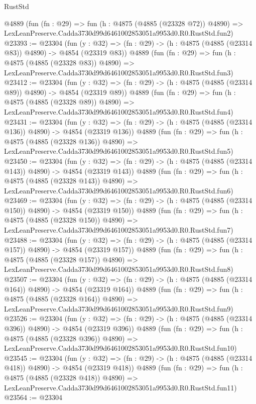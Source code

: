 \begin{lexlean}{RustStd}
\begin{coremodule}
    @4889
    (fun (fn : @29) =>
    fun (h : @4875 (@4885 (@23328 @72)) @4890) =>
    LexLeanPreserve.Cadda3730d99d6461002853051a9953d0.R0.RustStd.fun2)
@23393 := @23304
    (fun (y : @32) => (fn : @29) -> (h : @4875 (@4885 (@23314 @83)) @4890) -> @4854 (@23319 @83))
    @4889
    (fun (fn : @29) =>
    fun (h : @4875 (@4885 (@23328 @83)) @4890) =>
    LexLeanPreserve.Cadda3730d99d6461002853051a9953d0.R0.RustStd.fun3)
@23412 := @23304
    (fun (y : @32) => (fn : @29) -> (h : @4875 (@4885 (@23314 @89)) @4890) -> @4854 (@23319 @89))
    @4889
    (fun (fn : @29) =>
    fun (h : @4875 (@4885 (@23328 @89)) @4890) =>
    LexLeanPreserve.Cadda3730d99d6461002853051a9953d0.R0.RustStd.fun4)
@23431 := @23304
    (fun (y : @32) => (fn : @29) -> (h : @4875 (@4885 (@23314 @136)) @4890) -> @4854 (@23319 @136))
    @4889
    (fun (fn : @29) =>
    fun (h : @4875 (@4885 (@23328 @136)) @4890) =>
    LexLeanPreserve.Cadda3730d99d6461002853051a9953d0.R0.RustStd.fun5)
@23450 := @23304
    (fun (y : @32) => (fn : @29) -> (h : @4875 (@4885 (@23314 @143)) @4890) -> @4854 (@23319 @143))
    @4889
    (fun (fn : @29) =>
    fun (h : @4875 (@4885 (@23328 @143)) @4890) =>
    LexLeanPreserve.Cadda3730d99d6461002853051a9953d0.R0.RustStd.fun6)
@23469 := @23304
    (fun (y : @32) => (fn : @29) -> (h : @4875 (@4885 (@23314 @150)) @4890) -> @4854 (@23319 @150))
    @4889
    (fun (fn : @29) =>
    fun (h : @4875 (@4885 (@23328 @150)) @4890) =>
    LexLeanPreserve.Cadda3730d99d6461002853051a9953d0.R0.RustStd.fun7)
@23488 := @23304
    (fun (y : @32) => (fn : @29) -> (h : @4875 (@4885 (@23314 @157)) @4890) -> @4854 (@23319 @157))
    @4889
    (fun (fn : @29) =>
    fun (h : @4875 (@4885 (@23328 @157)) @4890) =>
    LexLeanPreserve.Cadda3730d99d6461002853051a9953d0.R0.RustStd.fun8)
@23507 := @23304
    (fun (y : @32) => (fn : @29) -> (h : @4875 (@4885 (@23314 @164)) @4890) -> @4854 (@23319 @164))
    @4889
    (fun (fn : @29) =>
    fun (h : @4875 (@4885 (@23328 @164)) @4890) =>
    LexLeanPreserve.Cadda3730d99d6461002853051a9953d0.R0.RustStd.fun9)
@23526 := @23304
    (fun (y : @32) => (fn : @29) -> (h : @4875 (@4885 (@23314 @396)) @4890) -> @4854 (@23319 @396))
    @4889
    (fun (fn : @29) =>
    fun (h : @4875 (@4885 (@23328 @396)) @4890) =>
    LexLeanPreserve.Cadda3730d99d6461002853051a9953d0.R0.RustStd.fun10)
@23545 := @23304
    (fun (y : @32) => (fn : @29) -> (h : @4875 (@4885 (@23314 @418)) @4890) -> @4854 (@23319 @418))
    @4889
    (fun (fn : @29) =>
    fun (h : @4875 (@4885 (@23328 @418)) @4890) =>
    LexLeanPreserve.Cadda3730d99d6461002853051a9953d0.R0.RustStd.fun11)
@23564 := @23304

\end{coremodule}
\end{lexlean}
